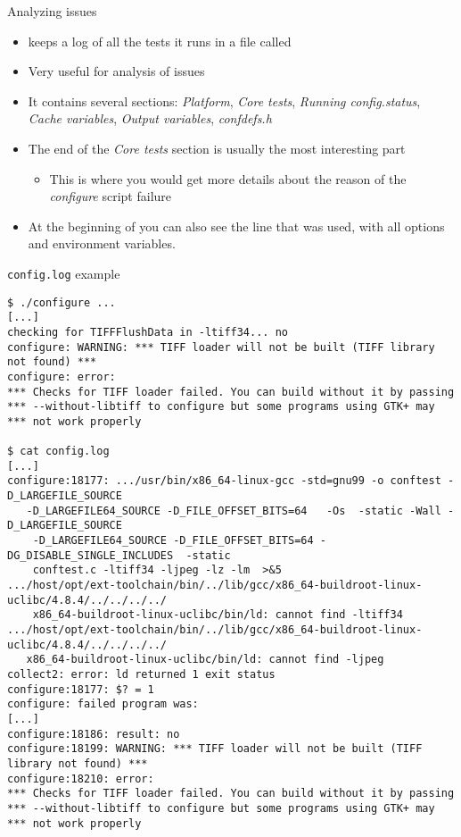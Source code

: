 \begin{frame}{Analyzing issues}
  \begin{itemize}
  \item {} keeps a log of all the tests it runs in a file
    called 
  \item Very useful for analysis of  issues
  \item It contains several sections: {\em Platform}, {\em Core
      tests}, {\em Running config.status}, {\em Cache variables}, {\em
      Output variables}, {\em confdefs.h}
  \item The end of the {\em Core tests} section is usually the most
    interesting part
    \begin{itemize}
    \item This is where you would get more details about the reason of
      the {\em configure} script failure
    \end{itemize}
  \item At the beginning of
     you can also see the
     line that was used, with all options and environment variables.
  \end{itemize}
\end{frame}

\begin{frame}[fragile]{{\tt config.log} example}

\begin{block}{}
{\tiny
\begin{verbatim}
$ ./configure ...
[...]
checking for TIFFFlushData in -ltiff34... no
configure: WARNING: *** TIFF loader will not be built (TIFF library not found) ***
configure: error: 
*** Checks for TIFF loader failed. You can build without it by passing
*** --without-libtiff to configure but some programs using GTK+ may
*** not work properly

$ cat config.log
[...]
configure:18177: .../usr/bin/x86_64-linux-gcc -std=gnu99 -o conftest -D_LARGEFILE_SOURCE
   -D_LARGEFILE64_SOURCE -D_FILE_OFFSET_BITS=64   -Os  -static -Wall -D_LARGEFILE_SOURCE
    -D_LARGEFILE64_SOURCE -D_FILE_OFFSET_BITS=64 -DG_DISABLE_SINGLE_INCLUDES  -static
    conftest.c -ltiff34 -ljpeg -lz -lm  >&5
.../host/opt/ext-toolchain/bin/../lib/gcc/x86_64-buildroot-linux-uclibc/4.8.4/../../../../
    x86_64-buildroot-linux-uclibc/bin/ld: cannot find -ltiff34
.../host/opt/ext-toolchain/bin/../lib/gcc/x86_64-buildroot-linux-uclibc/4.8.4/../../../../
   x86_64-buildroot-linux-uclibc/bin/ld: cannot find -ljpeg
collect2: error: ld returned 1 exit status
configure:18177: $? = 1
configure: failed program was:
[...]
configure:18186: result: no
configure:18199: WARNING: *** TIFF loader will not be built (TIFF library not found) ***
configure:18210: error: 
*** Checks for TIFF loader failed. You can build without it by passing
*** --without-libtiff to configure but some programs using GTK+ may
*** not work properly
\end{verbatim}}
\end{block}

\end{frame}

